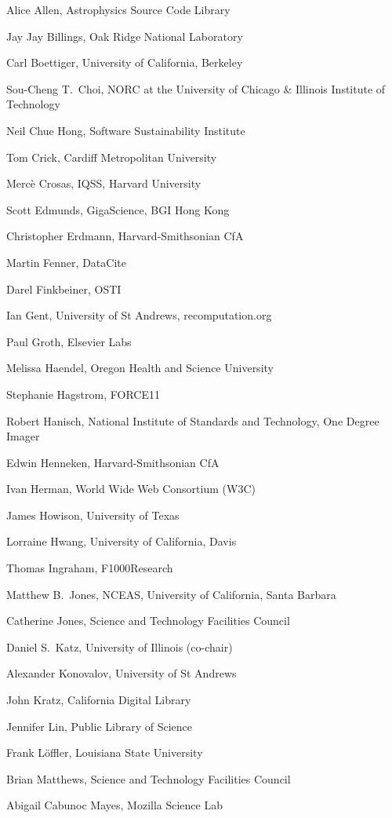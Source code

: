 \documentclass[11pt, oneside]{amsart}
\begin{document}
Alice Allen, Astrophysics Source Code Library

Jay Jay Billings, Oak Ridge National Laboratory

Carl Boettiger, University of California,  Berkeley

Sou-Cheng T.~Choi, NORC at the University of Chicago \& Illinois Institute of Technology

Neil Chue Hong, Software Sustainability Institute

Tom Crick, Cardiff Metropolitan University

Merc\`e Crosas, IQSS, Harvard University

Scott Edmunds, GigaScience, BGI Hong Kong

Christopher Erdmann, Harvard-Smithsonian CfA

Martin Fenner, DataCite

Darel Finkbeiner, OSTI

Ian Gent, University of St Andrews, recomputation.org

Paul Groth, Elsevier Labs

Melissa Haendel, Oregon Health and Science University

Stephanie Hagstrom, FORCE11

Robert Hanisch, National Institute of Standards and Technology, One Degree Imager

Edwin Henneken, Harvard-Smithsonian CfA

Ivan Herman, World Wide Web Consortium (W3C)

James Howison, University of Texas

Lorraine Hwang, University of California,  Davis

Thomas Ingraham, F1000Research

Matthew B.~Jones, NCEAS, University of California,  Santa Barbara

Catherine Jones, Science and Technology Facilities Council

Daniel S.~Katz, University of Illinois (co-chair)

Alexander Konovalov, University of St Andrews

John Kratz, California Digital Library

Jennifer Lin, Public Library of Science

Frank L\"offler, Louisiana State University

Brian Matthews, Science and Technology Facilities Council

Abigail Cabunoc Mayes, Mozilla Science Lab
\end{document}
